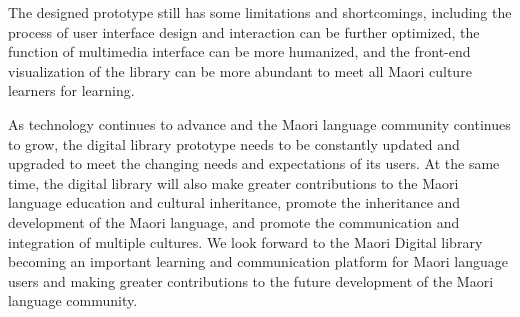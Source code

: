 The designed prototype still has some limitations and shortcomings, including the process of user interface design and interaction can be further optimized, the function of multimedia interface can be more humanized, and the front-end visualization of the library can be more abundant to meet all Maori culture learners for learning.

As technology continues to advance and the Maori language community continues to grow, the digital library prototype needs to be constantly updated and upgraded to meet the changing needs and expectations of its users. At the same time, the digital library will also make greater contributions to the Maori language education and cultural inheritance, promote the inheritance and development of the Maori language, and promote the communication and integration of multiple cultures. We look forward to the Maori Digital library becoming an important learning and communication platform for Maori language users and making greater contributions to the future development of the Maori language community\autocite{MaoriCul16:online}.
